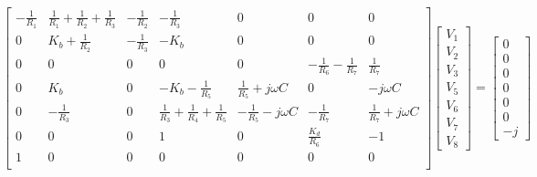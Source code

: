 \[
  \begin{bmatrix}
    - \frac{1}{R_1} & \frac{1}{R_1} + \frac{1}{R_2} + \frac{1}{R_3} & -\frac{1}{R_2} & -\frac{1}{R_3}                                & 0                          & 0                              & 0                          \\
    0               & K_b + \frac{1}{R_2}                           & -\frac{1}{R_3} & - K_b                                         & 0                          & 0                              & 0                          \\
    0               & 0                                             & 0              & 0                                             & 0                          & -\frac{1}{R_6} - \frac{1}{R_7} & \frac{1}{R_7}              \\
    0               & K_b                                           & 0              & -K_b - \frac{1}{R_5}                          & \frac{1}{R_5} + j\omega C  & 0                              & -j\omega C                 \\
    0               & -\frac{1}{R_3}                                & 0              & \frac{1}{R_3} + \frac{1}{R_4} + \frac{1}{R_5} & -\frac{1}{R_5} - j\omega C & -\frac{1}{R_7}                 & \frac{1}{R_7} + j \omega C \\
    0               & 0                                             & 0              & 1                                             & 0                          & \frac{K_d}{R_6}                & -1                         \\
    1               & 0                                             & 0              & 0                                             & 0                          & 0                              & 0                          \\
  \end{bmatrix}
  \begin{bmatrix}
    V_1 \\ V_2 \\ V_3 \\ V_5 \\ V_6 \\ V_7 \\ V_8
  \end{bmatrix}
  =
  \begin{bmatrix}
    0 \\ 0 \\ 0 \\ 0 \\ 0  \\ 0 \\ -j
  \end{bmatrix}
\]

